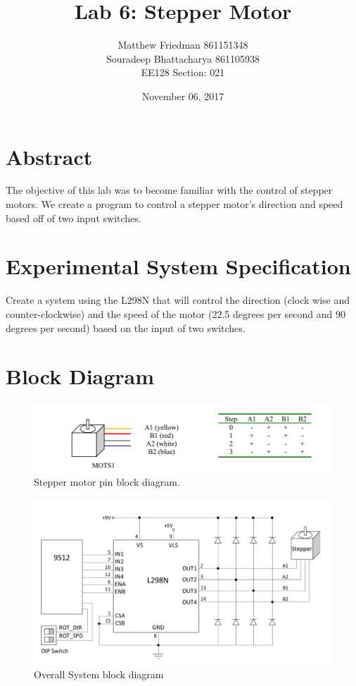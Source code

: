 \documentclass{article}
\title{Lab 6: Stepper Motor}
\date{November 06, 2017}
\author{Matthew Friedman 861151348\\Souradeep Bhattacharya 861105938\\EE128 Section: 021}
\begin{document}
	\maketitle
	\section*{Abstract}
	The objective of this lab was to become familiar with the control of stepper motors. We create a program to control a stepper motor's direction and speed based off of two input switches.
	\section*{Experimental System Specification}
	Create a system using the L298N that will control the direction (clock wise and counter-clockwise) and the speed of the motor (22.5 degrees per second and 90 degrees per second) based on the input of two switches.
	\section*{Block Diagram}
	\begin{figure}[H]
		\centering
		\includegraphics[width=1\textwidth]{StepperMotorBlock}
		\caption{Stepper motor pin block diagram.}
	\end{figure}
	\begin{figure}[H]
		\centering
		\includegraphics[width=1\textwidth]{OverallBlockDiagram}
		\caption{Overall System block diagram}
	\end{figure}
\end{document}
